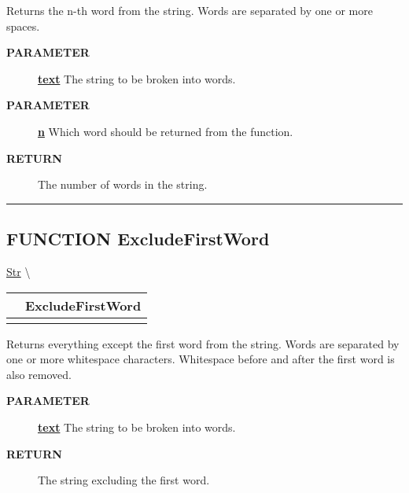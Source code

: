 \par
Returns the n-th word from the string. Words are separated by one or more spaces.

\par
\begin{description}
\item [\colorbox{tagtype}{\color{white} \textbf{\textsf{PARAMETER}}}] \textbf{\underline{text}} The string to be broken into words.
\item [\colorbox{tagtype}{\color{white} \textbf{\textsf{PARAMETER}}}] \textbf{\underline{n}} Which word should be returned from the function.
\item [\colorbox{tagtype}{\color{white} \textbf{\textsf{RETURN}}}] \textbf{\underline{}} The number of words in the string.
\end{description}

\rule{\linewidth}{0.5pt}
\subsection*{\textsf{\colorbox{headtoc}{\color{white} FUNCTION}
ExcludeFirstWord}}

\hypertarget{ecldoc:str.excludefirstword}{}
\hspace{0pt} \hyperlink{ecldoc:Str}{Str} \textbackslash 

{\renewcommand{\arraystretch}{1.5}
\begin{tabularx}{\textwidth}{|>{\raggedright\arraybackslash}l|X|}
\hline
\hspace{0pt}\mytexttt{\color{red} } & \textbf{ExcludeFirstWord} \\
\hline
\multicolumn{2}{|>{\raggedright\arraybackslash}X|}{\hspace{0pt}\mytexttt{\color{param} (STRING text)}} \\
\hline
\end{tabularx}
}

\par
Returns everything except the first word from the string. Words are separated by one or more whitespace characters. Whitespace before and after the first word is also removed.

\par
\begin{description}
\item [\colorbox{tagtype}{\color{white} \textbf{\textsf{PARAMETER}}}] \textbf{\underline{text}} The string to be broken into words.
\item [\colorbox{tagtype}{\color{white} \textbf{\textsf{RETURN}}}] \textbf{\underline{}} The string excluding the first word.
\end{description}

